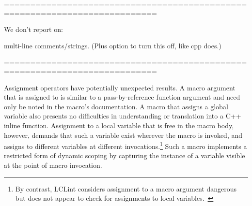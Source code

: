 ===========================================================================

We don't report on:

multi-line comments/strings.  (Plus option to turn this off, like cpp
        does.)

===========================================================================

Assignment operators have potentially unexpected results.  A macro argument
that is assigned to is similar to a pass-by-reference function argument and
need only be noted in the macro's documentation.  A macro that assigns a
global variable also presents no difficulties in understanding or
translation into a C++ inline function.  Assignment to a local variable
that is free in the macro body, however, demands that such a variable exist
wherever the macro is invoked, and assigns to different variables at
different invocations.\footnote{By contrast, LCLint considers assignment to
  a macro argument dangerous but does not appear to check for assignments
  to local variables.~\cite{Evans:LCLint}} Such a macro implements a
restricted form of dynamic scoping by capturing the instance of a variable
visible at the point of macro invocation.

